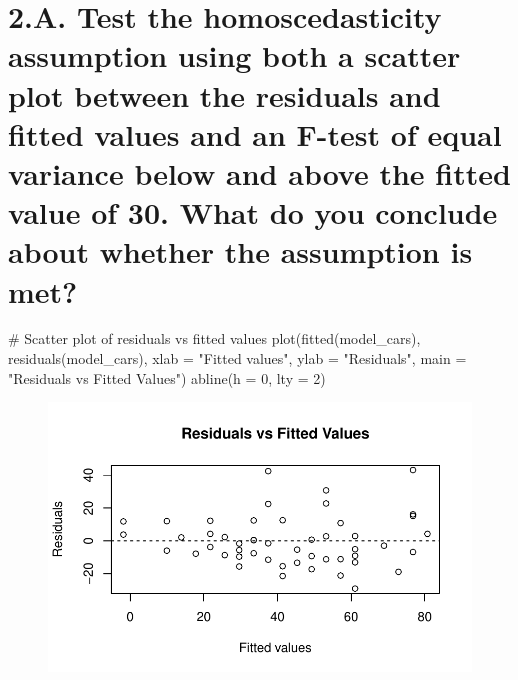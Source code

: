 \documentclass[
  letterpaper,
  DIV=11,
  numbers=noendperiod]{scrartcl}
\newenvironment{Shaded}{\begin{snugshade}}{\end{snugshade}}
\newcommand{\AttributeTok}[1]{\textcolor[rgb]{0.40,0.45,0.13}{#1}}
\newcommand{\CommentTok}[1]{\textcolor[rgb]{0.37,0.37,0.37}{#1}}
\newcommand{\DecValTok}[1]{\textcolor[rgb]{0.68,0.00,0.00}{#1}}
\newcommand{\FunctionTok}[1]{\textcolor[rgb]{0.28,0.35,0.67}{#1}}
\newcommand{\NormalTok}[1]{\textcolor[rgb]{0.00,0.23,0.31}{#1}}
\newcommand{\StringTok}[1]{\textcolor[rgb]{0.13,0.47,0.30}{#1}}
\begin{document}
\hypertarget{a.-test-the-homoscedasticity-assumption-using-both-a-scatter-plot-between-the-residuals-and-fitted-values-and-an-f-test-of-equal-variance-below-and-above-the-fitted-value-of-30.-what-do-you-conclude-about-whether-the-assumption-is-met}{%
\section{2.A. Test the homoscedasticity assumption using both a scatter
plot between the residuals and fitted values and an F-test of equal
variance below and above the fitted value of 30. What do you conclude
about whether the assumption is
met?}\label{a.-test-the-homoscedasticity-assumption-using-both-a-scatter-plot-between-the-residuals-and-fitted-values-and-an-f-test-of-equal-variance-below-and-above-the-fitted-value-of-30.-what-do-you-conclude-about-whether-the-assumption-is-met}}

\begin{Shaded}
\begin{Highlighting}[]
\CommentTok{\# Scatter plot of residuals vs fitted values}
\FunctionTok{plot}\NormalTok{(}\FunctionTok{fitted}\NormalTok{(model\_cars), }\FunctionTok{residuals}\NormalTok{(model\_cars),}
    \AttributeTok{xlab =} \StringTok{"Fitted values"}\NormalTok{, }\AttributeTok{ylab =} \StringTok{"Residuals"}\NormalTok{,}
    \AttributeTok{main =} \StringTok{"Residuals vs Fitted Values"}\NormalTok{)}
\FunctionTok{abline}\NormalTok{(}\AttributeTok{h =} \DecValTok{0}\NormalTok{, }\AttributeTok{lty =} \DecValTok{2}\NormalTok{)}
\end{Highlighting}
\end{Shaded}

\begin{figure}[H]

{\centering \includegraphics{HW8_files/figure-pdf/unnamed-chunk-7-1.pdf}

}

\end{figure}
\end{document}
